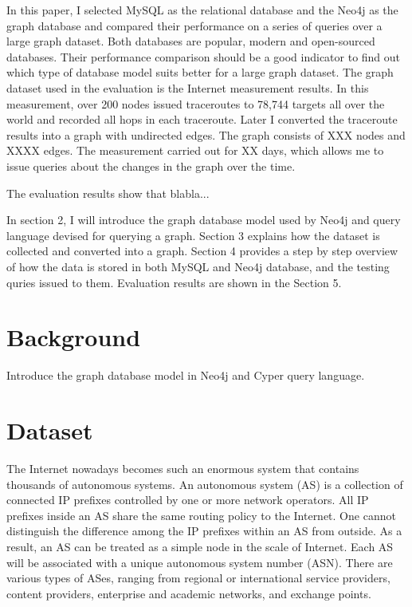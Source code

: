 \documentclass[letterpaper,twocolumn,10pt]{article}
\begin{document}
In this paper, I selected MySQL \cite{mysql} as the relational database and the Neo4j \cite{neo4j} as the graph database and compared their performance on a series of queries over a large graph dataset. Both databases are popular, modern and open-sourced databases. Their performance comparison should be a good indicator to find out which type of database model suits better for a large graph dataset. The graph dataset used in the evaluation is the Internet measurement results. In this measurement, over 200 nodes issued traceroutes to 78,744 targets all over the world and recorded all hops in each traceroute. Later I converted the traceroute results into a graph with undirected edges. The graph consists of XXX nodes and XXXX edges. The measurement carried out for XX days, which allows me to issue queries about the changes in the graph over the time.

The evaluation results show that blabla...

In section 2, I will introduce the graph database model used by Neo4j and query language devised for querying a graph. Section 3 explains how the dataset is collected and converted into a graph. Section 4 provides a step by step overview of how the data is stored in both MySQL and Neo4j database, and the testing quries issued to them. Evaluation results are shown in the Section 5.

\section{Background}
Introduce the graph database model in Neo4j and Cyper query language.

\section{Dataset}
The Internet nowadays becomes such an enormous system that contains thousands of autonomous systems. An autonomous system (AS) is a collection of connected IP prefixes controlled by one or more network operators. All IP prefixes inside an AS share the same routing policy to the Internet. One cannot distinguish the difference among the IP prefixes within an AS from outside. As a result, an AS can be treated as a simple node in the scale of Internet. Each AS will be associated with a unique autonomous system number (ASN). There are various types of ASes, ranging from regional or international service providers, content providers, enterprise and academic networks, and exchange points. 
\end{document}
